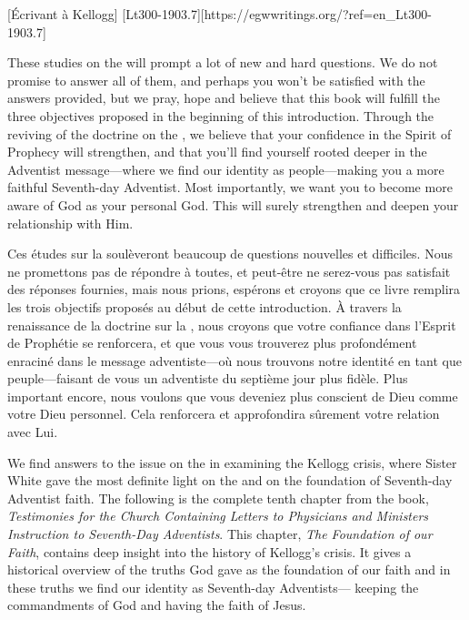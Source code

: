 [Écrivant à Kellogg] [Lt300-1903.7][https://egwwritings.org/?ref=en\_Lt300-1903.7]


These studies on the  will prompt a lot of new and hard questions. We do not promise to answer all of them, and perhaps you won’t be satisfied with the answers provided, but we pray, hope and believe that this book will fulfill the three objectives proposed in the beginning of this introduction. Through the reviving of the doctrine on the , we believe that your confidence in the Spirit of Prophecy will strengthen, and that you’ll find yourself rooted deeper in the Adventist message—where we find our identity as people—making you a more faithful Seventh-day Adventist. Most importantly, we want you to become more aware of God as your personal God. This will surely strengthen and deepen your relationship with Him.


Ces études sur la  soulèveront beaucoup de questions nouvelles et difficiles. Nous ne promettons pas de répondre à toutes, et peut-être ne serez-vous pas satisfait des réponses fournies, mais nous prions, espérons et croyons que ce livre remplira les trois objectifs proposés au début de cette introduction. À travers la renaissance de la doctrine sur la , nous croyons que votre confiance dans l'Esprit de Prophétie se renforcera, et que vous vous trouverez plus profondément enraciné dans le message adventiste—où nous trouvons notre identité en tant que peuple—faisant de vous un adventiste du septième jour plus fidèle. Plus important encore, nous voulons que vous deveniez plus conscient de Dieu comme votre Dieu personnel. Cela renforcera et approfondira sûrement votre relation avec Lui.


We find answers to the issue on the  in examining the Kellogg crisis, where Sister White gave the most definite light on the  and on the foundation of Seventh-day Adventist faith. The following is the complete tenth chapter from the book, \textit{Testimonies for the Church Containing Letters to Physicians and Ministers Instruction to Seventh-Day Adventists}. This chapter, \textit{The Foundation of our Faith}, contains deep insight into the history of Kellogg’s crisis. It gives a historical overview of the truths God gave as the foundation of our faith and in these truths we find our identity as Seventh-day Adventists— keeping the commandments of God and having the faith of Jesus.


